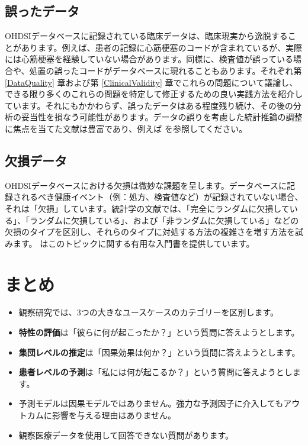\documentclass[
  11pt]{book}
\makeatletter
\newenvironment{kframe}{%
\medskip{}
\setlength{\fboxsep}{.8em}
 \def\at@end@of@kframe{}%
 \ifinner\ifhmode%
  \def\at@end@of@kframe{\end{minipage}}%
  \begin{minipage}{\columnwidth}%
 \fi\fi%
 \def\FrameCommand##1{\hskip\@totalleftmargin \hskip-\fboxsep
 \colorbox{myShadeColor}{##1}\hskip-\fboxsep
     \hskip-\linewidth \hskip-\@totalleftmargin \hskip\columnwidth}%
 \MakeFramed {\advance\hsize-\width
   \@totalleftmargin\z@ \linewidth\hsize
   \@setminipage}}%
 {\par\unskip\endMakeFramed%
 \at@end@of@kframe}
\newenvironment{rmdblock}[1]
  {
  \begin{itemize}
  \renewcommand{\labelitemi}{
    \raisebox{-.7\height}[0pt][0pt]{
      {\setkeys{Gin}{width=3em,keepaspectratio}\texttt{[image: images/\#1]}}
    }
  }
  \setlength{\fboxsep}{1em}
  \begin{kframe}
  \item
  }
  {
  \end{kframe}
  \end{itemize}
  }
\newenvironment{rmdsummary}
  {\begin{rmdblock}{summary}}
  {\end{rmdblock}}
\theoremstyle{definition}
\theoremstyle{definition}
\theoremstyle{definition}
\theoremstyle{definition}
\theoremstyle{remark}
\makeatother
\begin{document}
\subsection{誤ったデータ}\label{ux8aa4ux3063ux305fux30c7ux30fcux30bf}

OHDSIデータベースに記録されている臨床データは、臨床現実から逸脱することがあります。例えば、患者の記録に心筋梗塞のコードが含まれているが、実際には心筋梗塞を経験していない場合があります。同様に、検査値が誤っている場合や、処置の誤ったコードがデータベースに現れることもあります。それぞれ第 \ref{DataQuality} 章および第 \ref{ClinicalValidity} 章でこれらの問題について議論し、できる限り多くのこれらの問題を特定して修正するための良い実践方法を紹介しています。それにもかかわらず、誤ったデータはある程度残り続け、その後の分析の妥当性を損なう可能性があります。データの誤りを考慮した統計推論の調整に焦点を当てた文献は豊富であり、例えば \citet{fuller2009measurement} を参照してください。

\subsection{欠損データ}\label{ux6b20ux640dux30c7ux30fcux30bf}


OHDSIデータベースにおける欠損は微妙な課題を呈します。データベースに記録されるべき健康イベント（例：処方、検査値など）が記録されていない場合、それは「欠損」しています。統計学の文献では、「完全にランダムに欠損している」、「ランダムに欠損している」、および「非ランダムに欠損している」などの欠損のタイプを区別し、それらのタイプに対処する方法の複雑さを増す方法を試みます。\citet{perkins2017principled} はこのトピックに関する有用な入門書を提供しています。

\section{まとめ}\label{ux307eux3068ux3081-5}

\begin{rmdsummary}
\begin{itemize}
\item
  観察研究では、3つの大きなユースケースのカテゴリーを区別します。
\item
  \textbf{特性の評価}は「彼らに何が起こったか？」という質問に答えようとします。
\item
  \textbf{集団レベルの推定}は「因果効果は何か？」という質問に答えようとします。
\item
  \textbf{患者レベルの予測}は「私には何が起こるか？」という質問に答えようとします。
\item
  予測モデルは因果モデルではありません。強力な予測因子に介入してもアウトカムに影響を与える理由はありません。
\item
  観察医療データを使用して回答できない質問があります。
\end{itemize}
\end{rmdsummary}
\end{document}
